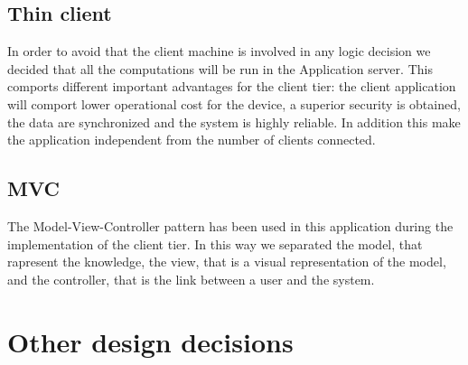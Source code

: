 \subsection{Thin client}
	In order to avoid that the client machine is involved in any logic decision we decided that all the computations will be run in the Application server. This comports different important advantages for the client tier: the client application will comport lower operational cost for the device, a superior security is obtained, the data are synchronized and the system is highly reliable. In addition this make the application independent from the number of clients connected.
\subsection{MVC}
	The Model-View-Controller pattern has been used in this application during the implementation of the client tier. In this way we separated the model, that rapresent the knowledge, the view, that is a visual representation of the model, and the controller, that is the link between a user and the system.

 \section{Other design decisions}
 	\blindtext